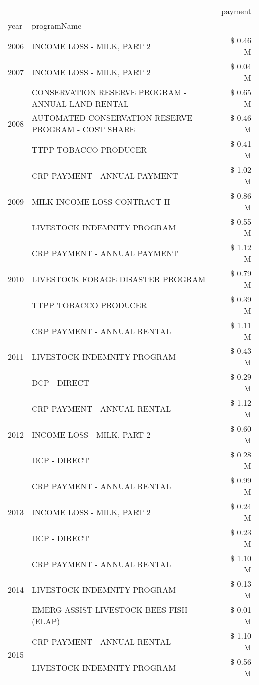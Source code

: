 \begin{tabular}{llr}
\toprule
 &  & payment \\
year & programName &  \\
\midrule
2006 & INCOME LOSS - MILK, PART 2 & \$ 0.46 M \\
\cline{1-3}
2007 & INCOME LOSS - MILK, PART 2 & \$ 0.04 M \\
\cline{1-3}
\multirow[t]{3}{*}{2008} & CONSERVATION RESERVE PROGRAM - ANNUAL LAND RENTAL & \$ 0.65 M \\
 & AUTOMATED CONSERVATION RESERVE PROGRAM - COST SHARE & \$ 0.46 M \\
 & TTPP TOBACCO PRODUCER & \$ 0.41 M \\
\cline{1-3}
\multirow[t]{3}{*}{2009} & CRP PAYMENT - ANNUAL PAYMENT & \$ 1.02 M \\
 & MILK INCOME LOSS CONTRACT II & \$ 0.86 M \\
 & LIVESTOCK INDEMNITY PROGRAM & \$ 0.55 M \\
\cline{1-3}
\multirow[t]{3}{*}{2010} & CRP PAYMENT - ANNUAL PAYMENT & \$ 1.12 M \\
 & LIVESTOCK FORAGE DISASTER  PROGRAM & \$ 0.79 M \\
 & TTPP TOBACCO PRODUCER & \$ 0.39 M \\
\cline{1-3}
\multirow[t]{3}{*}{2011} & CRP PAYMENT - ANNUAL RENTAL & \$ 1.11 M \\
 & LIVESTOCK INDEMNITY PROGRAM & \$ 0.43 M \\
 & DCP - DIRECT & \$ 0.29 M \\
\cline{1-3}
\multirow[t]{3}{*}{2012} & CRP PAYMENT - ANNUAL RENTAL & \$ 1.12 M \\
 & INCOME LOSS - MILK, PART 2 & \$ 0.60 M \\
 & DCP - DIRECT & \$ 0.28 M \\
\cline{1-3}
\multirow[t]{3}{*}{2013} & CRP PAYMENT - ANNUAL RENTAL & \$ 0.99 M \\
 & INCOME LOSS - MILK, PART 2 & \$ 0.24 M \\
 & DCP - DIRECT & \$ 0.23 M \\
\cline{1-3}
\multirow[t]{3}{*}{2014} & CRP PAYMENT - ANNUAL RENTAL & \$ 1.10 M \\
 & LIVESTOCK INDEMNITY PROGRAM & \$ 0.13 M \\
 & EMERG ASSIST LIVESTOCK BEES FISH (ELAP) & \$ 0.01 M \\
\cline{1-3}
\multirow[t]{3}{*}{2015} & CRP PAYMENT - ANNUAL RENTAL & \$ 1.10 M \\
 & LIVESTOCK INDEMNITY PROGRAM & \$ 0.56 M \\

\end{tabular}

